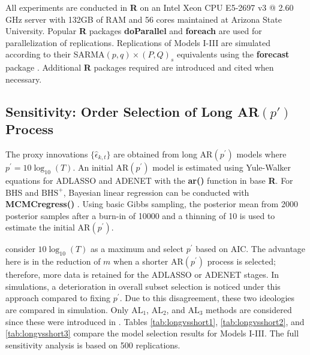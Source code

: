 All experiments are conducted in {\bf R} \citep{RCORETEAM} on an Intel Xeon CPU E5-2697 v3 @ 2.60 GHz server with 132GB of RAM and 56 cores maintained at Arizona State University. Popular {\bf R} packages {\bf doParallel} and {\bf foreach} are used for parallelization of replications. Replications of Models I-III are simulated according to their SARMA$(p,q)\times(P,Q)_s$ equivalents using the {\bf forecast} package  \citep{Hyndman2008}. Additional {\bf R} packages required are introduced and cited when necessary. %

\subsection{Sensitivity: Order Selection of Long AR$(p')$ Process}
The proxy innovations $\{\hat{\epsilon}_{k,t}\}$ are obtained from long AR$(p^\prime)$ models where $p^\prime=10\log_{10}(T)$.  An initial AR$(p^\prime)$ model is estimated using Yule-Walker equations for ADLASSO and ADENET with the {\bf ar()} function in base {\bf R}. For BHS and $\textrm{BHS}^+$, Bayesian linear regression \citep[pg.354]{Gelman2014} can be conducted with  {\bf MCMCregress()} \citep{MCMCpack}. Using basic Gibbs sampling, the posterior mean from 2000 posterior samples after a burn-in of 10000 and a thinning of 10 is used to estimate the initial AR$(p^\prime)$. 

\cite{Chen2011} consider $10\log_{10}(T)$ as a maximum and select $p^\prime$ based on AIC. The advantage here is in the reduction of $m$ when a shorter AR$(p^\prime)$ process is selected; therefore, more data is retained for the ADLASSO or ADENET stages. In simulations, a deterioration in overall subset selection is noticed under this approach compared to fixing $p^\prime$. Due to this disagreement, these two ideologies are compared in simulation. Only $\textrm{AL}_1$, $\textrm{AL}_2$, and $\textrm{AL}_3$ methods are considered since these were introduced in \cite{Chen2011}. Tables \ref{tab:longvsshort1}, \ref{tab:longvsshort2}, and \ref{tab:longvsshort3} compare the model selection results for Models I-III. The full sensitivity analysis is based on 500 replications.

